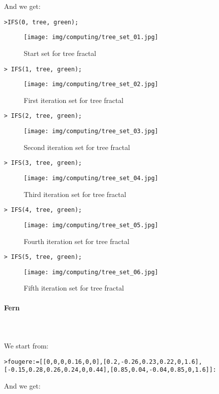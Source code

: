 	And we get:
	
	\texttt{>IFS(0, tree, green);}
	\begin{figure}[H]
		\centering
		\texttt{[image: img/computing/tree\_set\_01.jpg]}
		\caption[]{Start set for tree fractal}
	\end{figure}
	\texttt{> IFS(1, tree, green);}
	\begin{figure}[H]
		\centering
		\texttt{[image: img/computing/tree\_set\_02.jpg]}
		\caption[]{First iteration set for tree fractal}
	\end{figure}
	\texttt{> IFS(2, tree, green);}
	\begin{figure}[H]
		\centering
		\texttt{[image: img/computing/tree\_set\_03.jpg]}
		\caption[]{Second iteration set for tree fractal}
	\end{figure}
	\texttt{> IFS(3, tree, green);}
	\begin{figure}[H]
		\centering
		\texttt{[image: img/computing/tree\_set\_04.jpg]}
		\caption[]{Third iteration set for tree fractal}
	\end{figure}
	\texttt{> IFS(4, tree, green);}
	\begin{figure}[H]
		\centering
		\texttt{[image: img/computing/tree\_set\_05.jpg]}
		\caption[]{Fourth iteration set for tree fractal}
	\end{figure}
	\texttt{> IFS(5, tree, green);}
	\begin{figure}[H]
		\centering
		\texttt{[image: img/computing/tree\_set\_06.jpg]}
		\caption[]{Fifth iteration set for tree fractal}
	\end{figure}
	
	\pagebreak
	\paragraph{Fern}\mbox{}\\\\
	We start from:
	
	\texttt{>fougere:=[[0,0,0,0.16,0,0],[0.2,-0.26,0.23,0.22,0,1.6],}
	\texttt{[-0.15,0.28,0.26,0.24,0,0.44],[0.85,0.04,-0.04,0.85,0,1.6]]:}

	And we get:
	
